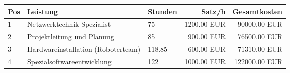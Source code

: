 
                \begin{tabularx}{\textwidth}{|l|X|l|r|r|}
                \hline
                \rowcolor{gray!30}
                \textbf{Pos} & \textbf{Leistung} & \textbf{Stunden} & \textbf{Satz/h} & \textbf{Gesamtkosten} \\
                \hline 
            

                    1 & Netzwerktechnik-Spezialist & 75 & 1200.00 EUR & 90000.00 EUR \\
                    \hline 
                    
                    2 & Projektleitung und Planung & 85 & 900.00 EUR & 76500.00 EUR \\
                    \hline 
                    
                    3 & Hardwareinstallation (Roboterteam) & 118.85 & 600.00 EUR & 71310.00 EUR \\
                    \hline 
                    
                    4 & Spezialsoftwareentwicklung & 122 & 1000.00 EUR & 122000.00 EUR \\
                    \hline 
                    

                \end{tabularx} 
            